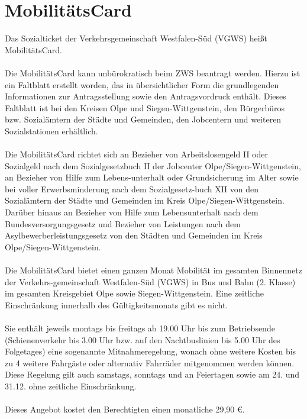 \section{MobilitätsCard}

Das Sozialticket der Verkehrsgemeinschaft Westfalen-Süd (VGWS) heißt MobilitätsCard. \\
\\
Die MobilitätsCard kann unbürokratisch beim ZWS beantragt werden. Hierzu ist ein Faltblatt erstellt worden, das in übersichtlicher Form die grundlegenden Informationen zur Antragsstellung sowie den Antragsvordruck enthält. Dieses Faltblatt ist bei den Kreisen Olpe und Siegen-Wittgenstein, den Bürgerbüros bzw. Sozialämtern der Städte und Gemeinden, den Jobcentern und weiteren Sozialstationen erhältlich.\\
\\
Die MobilitätsCard richtet sich an Bezieher von Arbeitslosengeld II oder Sozialgeld nach dem Sozialgesetzbuch II der Jobcenter Olpe/Siegen-Wittgenstein, an Bezieher von Hilfe zum Lebens-unterhalt oder Grundsicherung im Alter sowie bei voller Erwerbsminderung nach dem Sozialgesetz-buch XII von den Sozialämtern der Städte und Gemeinden im Kreis Olpe/Siegen-Wittgenstein. Darüber hinaus an Bezieher von Hilfe zum Lebensunterhalt nach dem Bundesver\-sorgungsgesetz und Bezieher von Leistungen nach dem Asylbewerberleistungsgesetz von den Städten und Gemeinden im Kreis Olpe/Siegen-Wittgenstein.\\
\\
Die MobilitätsCard bietet einen ganzen Monat Mobilität im gesamten Binnennetz der Verkehrs-gemeinschaft Westfalen-Süd (VGWS) in Bus und Bahn (2. Klasse) im gesamten Kreisgebiet Olpe sowie Siegen-Wittgenstein. Eine zeitliche Einschränkung innerhalb des Gültigkeitsmonats gibt es nicht.\\
\\
Sie enthält jeweils montags bis freitags ab 19.00 Uhr bis zum Betriebsende (Schienenverkehr bis 3.00 Uhr bzw. auf den Nachtbuslinien bis 5.00 Uhr des Folgetages) eine sogenannte Mitnahmeregelung, wonach ohne weitere Kosten bis zu 4 weitere Fahrgäste oder alternativ Fahrräder mitgenommen werden können. Diese Regelung gilt auch samstags, sonntags und an Feiertagen sowie am 24. und 31.12. ohne zeitliche Einschränkung.\\
\\
Dieses Angebot kostet den Berechtigten einen monatliche 29,90 \euro.\\
\\
